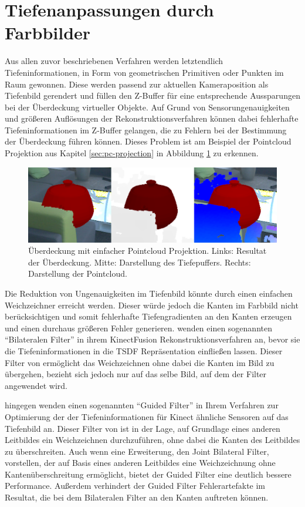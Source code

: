 \section{Tiefenanpassungen durch Farbbilder}

Aus allen zuvor beschriebenen Verfahren werden letztendlich Tiefeninformationen, in Form von geometrischen Primitiven oder Punkten im Raum gewonnen. Diese werden passend zur aktuellen Kameraposition als Tiefenbild gerendert und füllen den Z-Buffer für eine entsprechende Aussparungen bei der Überdeckung virtueller Objekte. Auf Grund von Sensorungenauigkeiten und größeren Auflösungen der Rekonstruktionsverfahren können dabei fehlerhafte Tiefeninformationen im Z-Buffer gelangen, die zu Fehlern bei der Bestimmung der Überdeckung führen können. Dieses Problem ist am Beispiel der Pointcloud Projektion aus Kapitel \ref{sec:pc-projection} in Abbildung \ref{fig:pc-noise} zu erkennen. 

\begin{figure}[h]
  \centering
	\includegraphics[width=1.0\textwidth]{content/images/methods/pc-noise.png} 
  \caption{Überdeckung mit einfacher Pointcloud Projektion. Links: Resultat der Überdeckung. Mitte: Darstellung des Tiefepuffers. Rechts: Darstellung der Pointcloud.}
  \label{fig:pc-noise}
\end{figure}

Die Reduktion von Ungenauigkeiten im Tiefenbild könnte durch einen einfachen Weichzeichner erreicht werden. Dieser würde jedoch die Kanten im Farbbild nicht berücksichtigen und somit fehlerhafte Tiefengradienten an den Kanten erzeugen und einen durchaus größeren Fehler generieren. \citet{newcombe2011kinectfusion} wenden einen sogenannten \enquote{Bilateralen Filter} in ihrem KinectFusion Rekonstruktionsverfahren an, bevor sie die Tiefeninformationen in die TSDF Repräsentation einfließen lassen. Dieser Filter von \citet{tomasi1998bilateral} ermöglicht das Weichzeichnen ohne dabei die Kanten im Bild zu übergehen, bezieht sich jedoch nur auf das selbe Bild, auf dem der Filter angewendet wird. 

\citet{liu2012guided} hingegen wenden einen sogenannten \enquote{Guided Filter} in Ihrem Verfahren zur Optimierung der der Tiefeninformationen für Kinect ähnliche Sensoren auf das Tiefenbild an. Dieser Filter von \citet{he2010guided} ist in der Lage, auf Grundlage eines anderen Leitbildes ein Weichzeichnen durchzuführen, ohne dabei die Kanten des Leitbildes zu überschreiten. Auch wenn \citet{petschnigg2004digital} eine Erweiterung, den Joint Bilateral Filter, vorstellen, der auf Basis eines anderen Leitbildes eine Weichzeichnung ohne Kantenüberschreitung ermöglicht, bietet der Guided Filter eine deutlich bessere Performance. Außerdem verhindert der Guided Filter Fehlerartefakte im Resultat, die bei dem Bilateralen Filter an den Kanten auftreten können. \citep{he2010guided} 

